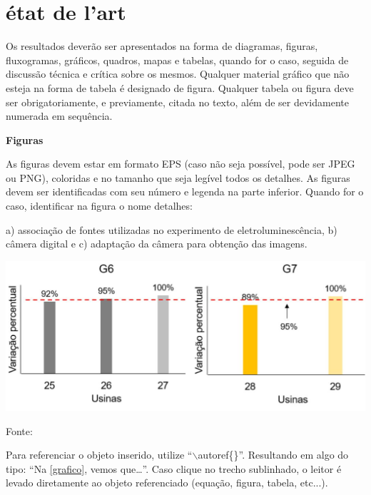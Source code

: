 \chapter{état de l’art}\label{chapter:etat}

Os resultados deverão ser apresentados na forma de diagramas, figuras, fluxogramas, gráficos, quadros, mapas e tabelas, quando for o caso, seguida de discussão técnica e crítica sobre os mesmos. Qualquer material gráfico que não esteja na forma de tabela é designado de figura. Qualquer tabela ou figura deve ser obrigatoriamente, e previamente, citada no texto, além de ser devidamente numerada em sequência. 


\noindent\textbf{Figuras}

As figuras devem estar em formato EPS (caso não seja possível, pode ser JPEG ou PNG), coloridas e no tamanho que seja legível todos os detalhes. As figuras devem ser identificadas com seu número e legenda na parte inferior. Quando for o caso, identificar na figura o nome detalhes:


\begin{figura}[h!bt]
	\caption{a) associação de fontes utilizadas no experimento de eletroluminescência, b) câmera digital e c) adaptação da câmera para obtenção das imagens.}
	\begin{center}
	    \includegraphics[scale=0.35]{figuras/fig1.jpg}
	\end{center}
    \label{grafico}
	\centering Fonte: 
\end{figura}

Para referenciar o objeto inserido, utilize ``$\backslash$autoref\{\}''. Resultando em algo do tipo: ``Na \underline{\autoref{grafico}}, vemos que\ldots''. Caso clique no trecho sublinhado, o leitor é levado diretamente ao objeto referenciado (equação, figura, tabela, etc...).

